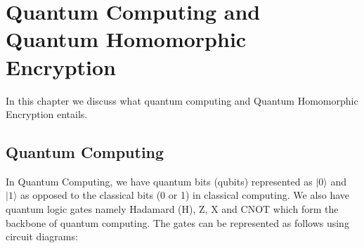 \chapter{Quantum Computing and Quantum Homomorphic Encryption}
In this chapter we discuss what quantum computing and Quantum Homomorphic Encryption entails. 

\section{Quantum Computing}
In Quantum Computing, we have quantum bits (qubits) represented as $|0\rangle$ and $|1\rangle$  as opposed to the classical bits (0 or 1) in classical computing.  We also have quantum logic gates namely Hadamard (H), Z, X and CNOT which form the backbone of quantum computing. The gates can be represented as follows using circuit diagrams:
